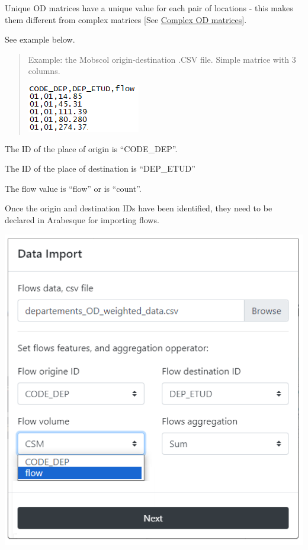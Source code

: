 \documentclass[
  letterpaper,
  DIV=11,
  numbers=noendperiod]{scrreprt}
\begin{document}
Unique OD matrices have a unique value for each pair of locations - this
makes them different from complex matrices {[}See
\hyperref[complex-od-matrices]{Complex OD matrices}{]}.

See example below.

\begin{quote}
Example: the Mobscol origin-destination .CSV file. Simple matrice with 3
columns.

\includegraphics{images/Example_mobscol_ODsimple_CSV.PNG}
\end{quote}

The ID of the place of origin is ``CODE\_DEP''.

The ID of the place of destination is ``DEP\_ETUD''

The flow value is ``flow'' or is ``count''.

Once the origin and destination IDs have been identified, they need to
be declared in Arabesque for importing flows.

\begin{center}
\includegraphics{images/Flowdata_import_simple.png}
\end{center}
\end{document}
